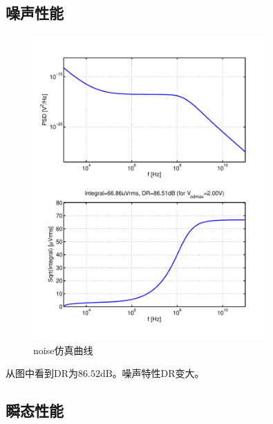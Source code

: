 \documentclass[a4paper]{article}
\newcommand{\udB}{\si{\deci\bel}}
\begin{document}
\subsection{噪声性能}
\begin{figure}[htb]
    \begin{center}
        \includegraphics[width=0.8\textwidth]{fast/noise.pdf}
    \end{center}
    \caption{noise仿真曲线}
    \label{fastnoise}
\end{figure}
从图中看到DR为$86.52\udB$。噪声特性DR变大。
\newpage
\clearpage
\subsection{瞬态性能}
\end{document}
